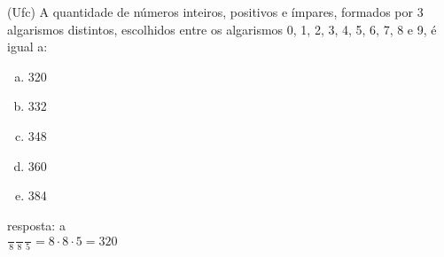 \begin{ex}
(Ufc) A quantidade de números inteiros, positivos e ímpares, formados por  3 algarismos distintos, escolhidos entre os algarismos 0, 1, 2, 3, 4, 5, 6, 7, 8 e 9, é igual a:
   \begin{enumerate}[(a)]
   \item 320
   \item 332
   \item 348
   \item 360
   \item 384
   \end{enumerate}
     \begin{sol}
     resposta: a \\
     $\frac{\phantom{A}}{8}\frac{\phantom{A}}{8}\frac{\phantom{A}}{5}=8\cdot8\cdot5=320$
     \end{sol}
\end{ex}